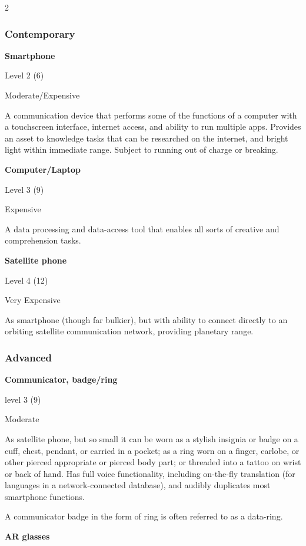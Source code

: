 \begin{multicols}{2}

\subsubsection{Contemporary}

\textbf{Smartphone}

Level 2 (6) 

Moderate/Expensive 

A communication device that performs some of the functions of a computer with a touchscreen interface, internet access, and ability to run multiple apps. Provides an asset to knowledge tasks that can be researched on the internet, and bright light within immediate range. Subject to running out of charge or breaking. 

\textbf{Computer/Laptop}

Level 3 (9) 

Expensive 

A data processing and data-access tool that enables all sorts of creative and comprehension tasks. 

\textbf{Satellite phone}

Level 4 (12) 

Very Expensive 

As smartphone (though far bulkier), but with ability to connect directly to an orbiting satellite communication network, providing planetary range.

\subsubsection{Advanced}

\textbf{Communicator, badge/ring}

level 3 (9) 

Moderate 

As satellite phone, but so small it can be worn as a stylish insignia or badge on a cuff, chest, pendant, or carried in a pocket; as a ring worn on a finger, earlobe, or other pierced appropriate or pierced body part; or threaded into a tattoo on wrist or back of hand. Has full voice functionality, including on-the-fly translation (for languages in a network-connected database), and audibly duplicates most smartphone functions. 

A communicator badge in the form of ring is often referred to as a data-ring.

\textbf{AR glasses}


\end{multicols}
